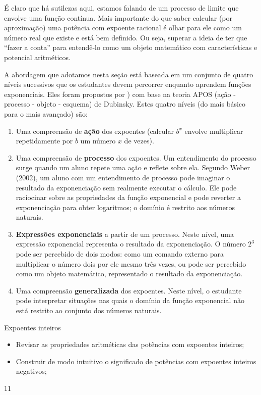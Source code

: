\begin{paginatexto}
É claro que há sutilezas aqui, estamos falando de um processo de limite que envolve uma função contínua. Mais importante do que saber calcular (por aproximação) uma potência com expoente racional é olhar para ele como um número real que existe e está bem definido. Ou seja, superar a ideia de ter que ``fazer a conta'' para entendê-lo como um objeto matemático com características e potencial aritméticos.

A abordagem que adotamos nesta seção está baseada em um conjunto de quatro níveis sucessivos que os estudantes devem percorrer enquanto aprendem funções exponenciais. Eles foram propostos por \citep{Weber2002}) com base na teoria APOS (ação - processo - objeto - esquema) de Dubinsky. Estes quatro níveis (do mais básico para o mais avançado) são:

\begin{enumerate}[label=\titem{\arabic*.}]
\item  Uma compreensão de \textbf{ação} dos expoentes (calcular $b^{x}$ envolve multiplicar repetidamente por $b$ um número $x$ de vezes).
\item  Uma compreensão de \textbf{processo} dos expoentes. Um entendimento do processo surge quando um aluno repete uma ação e reflete sobre ela. Segundo Weber (2002), um aluno com um entendimento de processo pode imaginar o resultado da exponenciação sem realmente executar o cálculo. Ele pode raciocinar sobre as propriedades da função exponencial e pode reverter a exponenciação para obter logaritmos; o domínio é restrito aos números naturais.

\item  \textbf{Expressões exponenciais} a partir de um processo. Neste nível, uma expressão exponencial representa o resultado da exponenciação. O número $2^{3}$ pode ser percebido de dois modos: como um comando externo para multiplicar o número dois por ele mesmo três vezes, ou pode ser percebido como um objeto matemático, representado o resultado da exponenciação.

\item  Uma compreensão \textbf{generalizada} dos expoentes. Neste nível, o estudante pode interpretar situações nas quais o domínio da função exponencial não está restrito ao conjunto dos números naturais.
\end{enumerate}
\end{paginatexto}
\def\currentcolor{session1}
\begin{objectives}{Expoentes inteiros}
{
\begin{itemize}
\item Revisar as propriedades aritméticas das potências com expoentes inteiros;
\item Construir de modo intuitivo o significado de potências com expoentes inteiros negativos;

\end{itemize}
}{1}{1}
\end{objectives}
